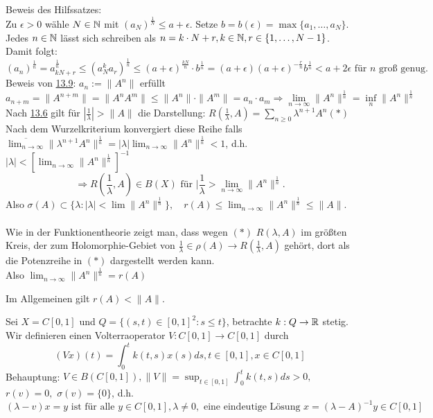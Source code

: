 \begin{beweis}
	Beweis des Hilfssatzes: \\
	Zu $\epsilon > 0$ wähle $N \in \mathbb{N}$ mit $(a_{N})^{\frac{1}{N}} \leq a + \epsilon$. Setze $b = b(\epsilon) = \max \{ a_{1}, \dotsc, a_{N} \}$. \\
	Jedes $n \in \mathbb{N}$ lässt sich schreiben als $n = k \cdot N + r, k \in \mathbb{N}, r \in \{ 1, \dotsc, N - 1 \}$. \\
	Damit folgt:
		\[ (a_{n})^{\frac{1}{n}} = a_{k N + r}^{\frac{1}{n}} \leq (a_{N}^{k} a_{r})^{\frac{1}{n}} \leq (a + \epsilon)^{\frac{k N}{n}} \cdot b^{\frac{1}{n}} = (a + \epsilon)(a + \epsilon)^{- \frac{r}{n}} b^{\frac{1}{n}} < a + 2 \epsilon \text{ für } n \text{ gro{\ss} genug.} \]
	Beweis von \hyperref[satz:13.9]{13.9}: $a_{n} := \| A^{n} \|$ erfüllt
	 \[ a_{n + m} = \| A^{n + m} \| = \| A^{n} A^{m} \| \leq \|A^{n}\| \cdot \|A^{m}\| = a_{n} \cdot a_{m} \Rightarrow \lim_{n \rightarrow \infty} \| A^{n} \|^{\frac{1}{n}} = \inf_{n} \| A^{n} \|^{\frac{1}{n}} \]
	Nach \hyperref[satz:13.6]{13.6} gilt für $\left| \frac{1}{\lambda} \right| > \| A \|$ die Darstellung: $R(\frac{1}{\lambda}, A) = \sum_{n \geq 0} \lambda^{n +1} A^{n} (*) \label{eq:13.9.5-*}$ \\ 
	Nach dem Wurzelkriterium konvergiert diese Reihe falls $\overline{\lim_{n \rightarrow \infty}} \| \lambda^{n + 1} A^{n} \|^{\frac{1}{n}} = |\lambda| \lim_{n \rightarrow \infty} \| A^{n} \|^{\frac{1}{n}} < 1$, d.h. $| \lambda | < \left[ \lim_{n \rightarrow \infty} \| A^{n} \|^{\frac{1}{n}} \right]^{-1}$
	\[ \Rightarrow R( \frac{1}{\lambda}, A) \in B(X) \text{ für } |\frac{1}{\lambda} > \lim_{n \rightarrow \infty} \| A^{n} \|^{\frac{1}{n}}. \]
	Also $\sigma(A) \subset \{ \lambda: |\lambda| < \lim \| A^{n} \|^{\frac{1}{n}} \}, \quad r(A) \leq \lim_{n \rightarrow \infty} \| A^{n} \|^{\frac{1}{n}} \leq \|A\|$. \\ \\
	Wie in der Funktionentheorie zeigt man, dass wegen \hyperref[eq:13.9.5-*]{$(*)$} $R(\lambda, A)$ im grö{\ss}ten Kreis, der zum Holomorphie-Gebiet von $\frac{1}{\lambda} \in \rho(A) \rightarrow R(\frac{1}{\lambda}, A)$ gehört, dort als die Potenzreihe in \hyperref[eq:13.9.5-*]{$(*)$} dargestellt werden kann. \\
	Also $\lim_{n \rightarrow \infty} \|A^{n} \|^{\frac{1}{n}} = r(A)$
\end{beweis}

Im Allgemeinen gilt $r(A) < \| A \|$.


\begin{beispiel} \label{bsp:13.10}
	Sei $X = C[0, 1]$ und  $Q = \{ (s, t) \in [0, 1]^{2}: s \leq t \}$, betrachte $k: Q \rightarrow \mathbb{R}$ stetig.  \\
	Wir definieren einen Volterraoperator $V: C[0, 1] \rightarrow C[0, 1]$ durch 
		\[ (V x)(t) = \int_{0}^{t} k(t, s) x(s) ds, t \in [0, 1], x \in C[0, 1] \]
	Behauptung: $V \in B(C[0, 1]), \| V \| = \sup_{t \in [0, 1]} \int_{0}^{t} k(t, s) ds > 0,$ $r(v) = 0,$ $\sigma(v) = \{ 0 \}$, d.h. \\
	\[ (\lambda - v)x = y \text{ ist für alle } y \in C[0, 1], \lambda \neq 0, \text{ eine eindeutige Lösung } x = (\lambda - A)^{-1} y \in C[0, 1] \]
\end{beispiel}

